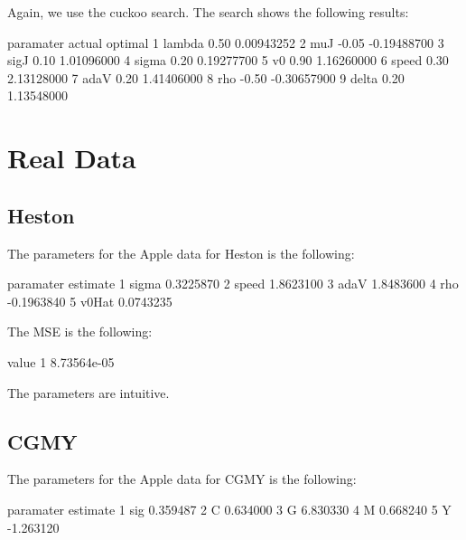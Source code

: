 \documentclass{article}
\begin{document}
Again, we use the cuckoo search. The search shows the following results:

\begin{Schunk}
\begin{Soutput}
  paramater actual     optimal
1    lambda   0.50  0.00943252
2       muJ  -0.05 -0.19488700
3      sigJ   0.10  1.01096000
4     sigma   0.20  0.19277700
5        v0   0.90  1.16260000
6     speed   0.30  2.13128000
7      adaV   0.20  1.41406000
8       rho  -0.50 -0.30657900
9     delta   0.20  1.13548000
\end{Soutput}
\end{Schunk}

\section{Real Data}

\subsection{Heston}

The parameters for the Apple data for Heston is the following:

\begin{Schunk}
\begin{Soutput}
  paramater   estimate
1     sigma  0.3225870
2     speed  1.8623100
3      adaV  1.8483600
4       rho -0.1963840
5     v0Hat  0.0743235
\end{Soutput}
\end{Schunk}

The MSE is the following:

\begin{Schunk}
\begin{Soutput}
        value
1 8.73564e-05
\end{Soutput}
\end{Schunk}

The parameters are intuitive.

\subsection{CGMY}

The parameters for the Apple data for CGMY is the following:

\begin{Schunk}
\begin{Soutput}
  paramater  estimate
1       sig  0.359487
2         C  0.634000
3         G  6.830330
4         M  0.668240
5         Y -1.263120
\end{Soutput}
\end{Schunk}
\end{document}
